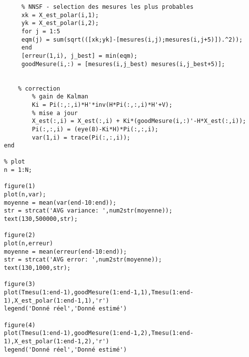 \begin{verbatim}
     % NNSF - selection des mesures les plus probables
     xk = X_est_polar(i,1);
     yk = X_est_polar(i,2);
     for j = 1:5
     eqm(j) = sum(sqrt(([xk;yk]-[mesures(i,j);mesures(i,j+5)]).^2));
     end
     [erreur(1,i), j_best] = min(eqm);
     goodMesure(i,:) = [mesures(i,j_best) mesures(i,j_best+5)];


    % correction
        % gain de Kalman
        Ki = Pi(:,:,i)*H'*inv(H*Pi(:,:,i)*H'+V);
        % mise a jour
        X_est(:,i) = X_est(:,i) + Ki*(goodMesure(i,:)'-H*X_est(:,i));
        Pi(:,:,i) = (eye(8)-Ki*H)*Pi(:,:,i);
        var(1,i) = trace(Pi(:,:,i));
end

% plot
n = 1:N;

figure(1)
plot(n,var);
moyenne = mean(var(end-10:end));
str = strcat('AVG variance: ',num2str(moyenne));
text(130,500000,str);

figure(2)
plot(n,erreur)
moyenne = mean(erreur(end-10:end));
str = strcat('AVG error: ',num2str(moyenne));
text(130,1000,str);

figure(3)
plot(Tmesu(1:end-1),goodMesure(1:end-1,1),Tmesu(1:end-1),X_est_polar(1:end-1,1),'r')
legend('Donné réel','Donné estimé')

figure(4)
plot(Tmesu(1:end-1),goodMesure(1:end-1,2),Tmesu(1:end-1),X_est_polar(1:end-1,2),'r')
legend('Donné réel','Donné estimé')
\end{verbatim}


